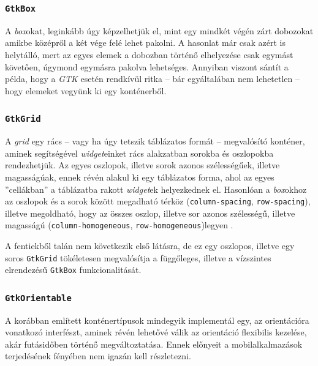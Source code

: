 \subsubsection{\texttt{GtkBox}}

A \textit{box}okat, leginkább úgy képzelhetjük el, mint egy mindkét végén zárt dobozokat amikbe középről a két vége felé lehet pakolni. A hasonlat már csak azért is helytálló, mert az egyes elemek a dobozban történő elhelyezése csak egymást követően, úgymond egymásra pakolva lehetséges. Annyiban viszont sántít a példa, hogy a \textit{GTK} esetén rendkívül ritka -- bár egyáltalában nem lehetetlen -- hogy elemeket vegyünk ki egy konténerből.

\subsubsection{\texttt{GtkGrid}}

A \textit{grid} egy rács -- vagy ha úgy tetszik táblázatos formát -- megvalósító konténer, aminek segítségével \textit{widget}einket rács alakzatban sorokba és oszlopokba rendezhetjük. Az egyes oszlopok, illetve sorok azonos szélességűek, illetve magasságúak, ennek révén alakul ki egy táblázatos forma, ahol az egyes ''cellákban'' a táblázatba rakott \textit{widget}ek helyezkednek el. Hasonlóan a \textit{box}okhoz az oszlopok és a sorok között megadható térköz (\texttt{column-spacing}, \texttt{row-spacing}), illetve megoldható, hogy az összes oszlop, illetve sor azonos szélességű, illetve magasságú (\texttt{column-homogeneous}, \texttt{row-homogeneous})legyen .

A fentiekből talán nem következik első látásra, de ez egy oszlopos, illetve egy soros \texttt{GtkGrid} tökéletesen megvalósítja a függőleges, illetve a vízszintes elrendezésű \texttt{GtkBox} funkcionalitását. 

\subsubsection{\texttt{GtkOrientable}}

A korábban említett konténertípusok mindegyik implementál egy, az orientációra vonatkozó interfészt, aminek révén lehetővé válik az orientáció flexibilis kezelése, akár futásidőben történő megváltoztatása. Ennek előnyeit a mobilalkalmazások terjedésének fényében nem igazán kell részletezni.

